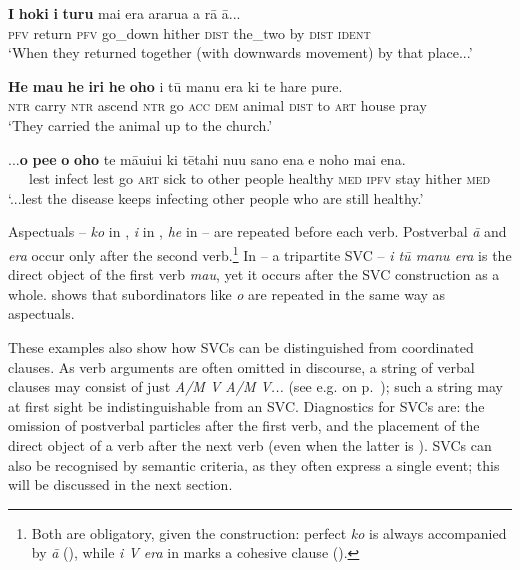 \ea\label{ex:7.172}
\gll \textbf{I} \textbf{hoki} \textbf{i} \textbf{turu} mai era ararua a rā {\ꞌ}ā... \\
\textsc{pfv} return \textsc{pfv} go\_down hither \textsc{dist} the\_two by \textsc{dist} \textsc{ident} \\

\glt 
‘When they returned together (with downwards movement) by that place...’ \textstyleExampleref{[R245.210]} 
\z

\ea\label{ex:7.173}
\gll \textbf{He} \textbf{ma{\ꞌ}u} \textbf{he} \textbf{iri} \textbf{he} \textbf{oho} i tū manu era ki te hare pure.\\
\textsc{ntr} carry \textsc{ntr} ascend \textsc{ntr} go \textsc{acc} \textsc{dem} animal \textsc{dist} to \textsc{art} house pray\\

\glt 
‘They carried the animal up to the church.’ \textstyleExampleref{[R178.053]} 
\z

\ea\label{ex:7.174}
\gll ...\textbf{{\ꞌ}o} \textbf{pe{\ꞌ}e} \textbf{{\ꞌ}o} \textbf{oho} te māuiui ki tētahi nu{\ꞌ}u sano ena e noho mai ena. \\
~~~lest infect lest go \textsc{art} sick to other people healthy \textsc{med} \textsc{ipfv} stay hither \textsc{med} \\

\glt
‘...lest the disease keeps infecting other people who are still healthy.’ \textstyleExampleref{[R398.017]} 
\z

Aspectuals – \textit{ko} in , \textit{i} in , \textit{he} in  – are repeated before each verb. Postverbal \textit{{\ꞌ}ā}  and \textit{era}  occur only after the second verb.\footnote{\label{fn:375}Both are obligatory, given the construction: perfect \textit{ko} is always accompanied by \textit{{\ꞌ}ā} (), while \textit{i V era} in  marks a cohesive clause ().} In  – a tripartite SVC – \textit{i tū manu era} is the direct object of the first verb \textit{ma{\ꞌ}u}, yet it occurs after the SVC construction as a whole.  shows that subordinators like \textit{{\ꞌ}o} are repeated in the same way as aspectuals. 

These examples also show how SVCs can be distinguished from coordinated clauses. As verb arguments are often omitted in discourse, a string of verbal clauses may consist of just \textit{A/M V A/M V...} (see e.g.  on p.~\pageref{ex:7.3}); such a string may at first sight be indistinguishable from an SVC. Diagnostics for SVCs are: the omission of postverbal particles after the first verb, and the placement of the direct object of a verb after the next verb (even when the latter is ). SVCs can also be recognised by semantic criteria, as they often express a single event; this will be discussed in the next section.

